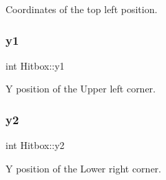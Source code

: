 Coordinates of the top left position. 

\mbox{\label{group__sprite_gae4b2bb3a226633c413ecc01795f1dec9}} 
\subsubsection{\texorpdfstring{y1}{y1}}
{\footnotesize\ttfamily int Hitbox\+::y1}



Y position of the Upper left corner. 

\mbox{\label{group__sprite_ga4786580e4912ad08c39f12150bdde84f}} 
\subsubsection{\texorpdfstring{y2}{y2}}
{\footnotesize\ttfamily int Hitbox\+::y2}



Y position of the Lower right corner. 

